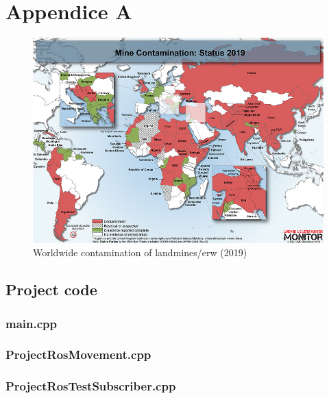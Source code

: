 \appendix

\hypertarget{AppA}{\chapter{Appendice A}}

\begin{figure}[h]
  \centering
  \includegraphics[width=\textwidth]{00 - Images/2019_MBT_Contamination_Final_Full.jpg}
  \caption{Worldwide contamination of landmines/\gls{erw} (2019) \cite{Monitor-Maps:online}}
  \label{fig:contamination_mine_erw}
\end{figure}

\section{Project code}

\subsection[language=C++]{main.cpp}



\subsection[language=C++]{ProjectRosMovement.cpp}



\subsection[language=C++]{ProjectRosTestSubscriber.cpp}

